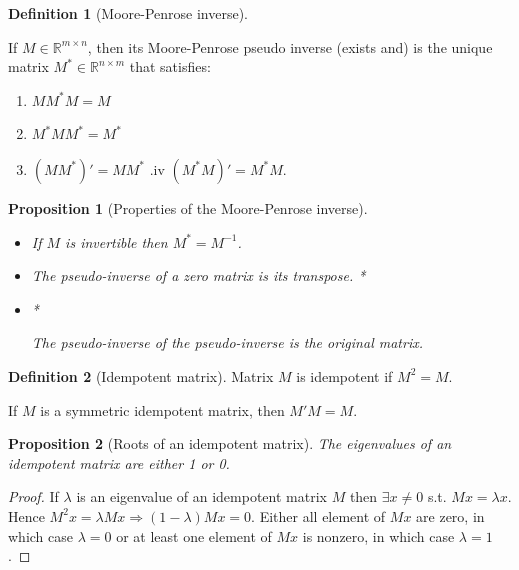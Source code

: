 \documentclass[
  11pt,
]{book}
\providecommand{\tightlist}{%
  \setlength{\itemsep}{0pt}\setlength{\parskip}{0pt}}
\newtheorem{proposition}{Proposition}[chapter]
\theoremstyle{definition}
\newtheorem{definition}{Definition}[chapter]
\theoremstyle{definition}
\theoremstyle{definition}
\theoremstyle{definition}
\theoremstyle{remark}
\begin{document}
\begin{definition}[Moore-Penrose inverse]
\protect\hypertarget{def:MoorPenrose}{}\label{def:MoorPenrose}

If \(M \in \mathbb{R}^{m \times n}\), then its Moore-Penrose pseudo inverse (exists and) is the unique matrix \(M^*  \in \mathbb{R}^{n \times m}\) that satisfies:

\begin{enumerate}
\def\labelenumi{\roman{enumi}.}
\tightlist
\item
  \(M M^* M = M\)
\item
  \(M^* M M^* = M^*\)
\item
  \((M M^*)'=M M^*\)
  .iv \((M^* M)'=M^* M\).
\end{enumerate}

\end{definition}

\begin{proposition}[Properties of the Moore-Penrose inverse]
\protect\hypertarget{prp:MoorPenrose}{}\label{prp:MoorPenrose}\leavevmode

\begin{itemize}
\tightlist
\item
  If \(M\) is invertible then \(M^* = M^{-1}\).
\item
  The pseudo-inverse of a zero matrix is its transpose.
  *

  \item*

  The pseudo-inverse of the pseudo-inverse is the original matrix.
\end{itemize}

\end{proposition}

\begin{definition}[Idempotent matrix]
\protect\hypertarget{def:idempotent}{}\label{def:idempotent}Matrix \(M\) is idempotent if \(M^2=M\).

If \(M\) is a symmetric idempotent matrix, then \(M'M=M\).
\end{definition}

\begin{proposition}[Roots of an idempotent matrix]
\protect\hypertarget{prp:rootsidempotent}{}\label{prp:rootsidempotent}The eigenvalues of an idempotent matrix are either 1 or 0.
\end{proposition}

\begin{proof}
If \(\lambda\) is an eigenvalue of an idempotent matrix \(M\) then \(\exists x \ne 0\) s.t. \(Mx=\lambda x\). Hence \(M^2x=\lambda M x \Rightarrow (1-\lambda)Mx=0\). Either all element of \(Mx\) are zero, in which case \(\lambda=0\) or at least one element of \(Mx\) is nonzero, in which case \(\lambda=1\).
\end{proof}
\end{document}
